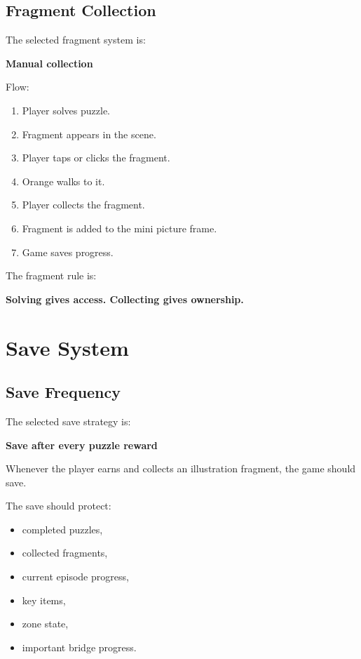 \documentclass[12pt]{article}
\begin{document}
\subsection{Fragment Collection}

The selected fragment system is:

\begin{center}
\textbf{Manual collection}
\end{center}

Flow:

\begin{enumerate}[leftmargin=*]
    \item Player solves puzzle.
    \item Fragment appears in the scene.
    \item Player taps or clicks the fragment.
    \item Orange walks to it.
    \item Player collects the fragment.
    \item Fragment is added to the mini picture frame.
    \item Game saves progress.
\end{enumerate}

The fragment rule is:

\begin{center}
\textbf{Solving gives access. Collecting gives ownership.}
\end{center}

\section{Save System}

\subsection{Save Frequency}

The selected save strategy is:

\begin{center}
\textbf{Save after every puzzle reward}
\end{center}

Whenever the player earns and collects an illustration fragment, the game should save.

The save should protect:

\begin{itemize}[leftmargin=*]
    \item completed puzzles,
    \item collected fragments,
    \item current episode progress,
    \item key items,
    \item zone state,
    \item important bridge progress.
\end{itemize}
\end{document}
